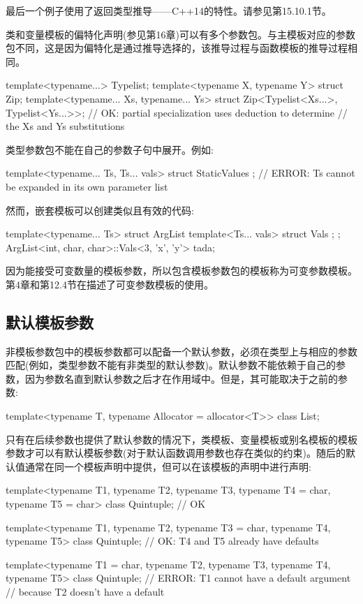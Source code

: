 最后一个例子使用了返回类型推导——C++14的特性。请参见第15.10.1节。

类和变量模板的偏特化声明(参见第16章)可以有多个参数包。与主模板对应的参数包不同，这是因为偏特化是通过推导选择的，该推导过程与函数模板的推导过程相同。

\begin{cpp}
template<typename...> Typelist;
template<typename X, typename Y> struct Zip;
template<typename... Xs, typename... Ys>
	struct Zip<Typelist<Xs...>, Typelist<Ys...>>;
	// OK: partial specialization uses deduction to determine
	// the Xs and Ys substitutions
\end{cpp}

类型参数包不能在自己的参数子句中展开。例如:

\begin{cpp}
template<typename... Ts, Ts... vals> struct StaticValues {};
// ERROR: Ts cannot be expanded in its own parameter list
\end{cpp}

然而，嵌套模板可以创建类似且有效的代码:

\begin{cpp}
template<typename... Ts> struct ArgList {
	template<Ts... vals> struct Vals {};
};
ArgList<int, char, char>::Vals<3, 'x', 'y'> tada;
\end{cpp}

因为能接受可变数量的模板参数，所以包含模板参数包的模板称为可变参数模板。第4章和第12.4节在描述了可变参数模板的使用。

\subsection{默认模板参数}

非模板参数包中的模板参数都可以配备一个默认参数，必须在类型上与相应的参数匹配(例如，类型参数不能有非类型的默认参数)。默认参数不能依赖于自己的参数，因为参数名直到默认参数之后才在作用域中。但是，其可能取决于之前的参数:

\begin{cpp}
template<typename T, typename Allocator = allocator<T>>
class List;
\end{cpp}

只有在后续参数也提供了默认参数的情况下，类模板、变量模板或别名模板的模板参数才可以有默认模板参数(对于默认函数调用参数也存在类似的约束)。随后的默认值通常在同一个模板声明中提供，但可以在该模板的声明中进行声明:

\begin{cpp}
template<typename T1, typename T2, typename T3,
typename T4 = char, typename T5 = char>
class Quintuple; // OK

template<typename T1, typename T2, typename T3 = char,
typename T4, typename T5>
class Quintuple; // OK: T4 and T5 already have defaults

template<typename T1 = char, typename T2, typename T3,
typename T4, typename T5>
class Quintuple; // ERROR: T1 cannot have a default argument
// because T2 doesn't have a default
\end{cpp}

